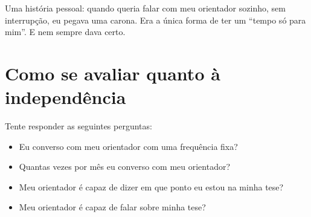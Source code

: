 

Uma história pessoal: quando queria falar com meu orientador sozinho, sem interrupção, eu pegava uma carona. Era a única forma de ter um “tempo só para mim”. E nem sempre dava certo.


\section{Como se avaliar quanto à independência}


Tente responder as seguintes perguntas:
\begin{itemize}
	\item Eu converso com meu orientador com uma frequência fixa?
	\item Quantas vezes por mês eu converso com meu orientador?
	\item Meu orientador é capaz de dizer em que ponto eu estou na minha tese?
	\item Meu orientador é capaz de falar sobre minha tese?
\end{itemize}




